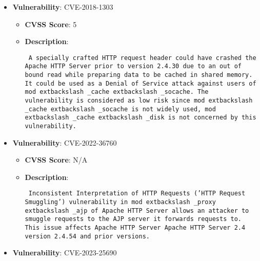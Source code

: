 \documentclass{article}
\begin{document}
\begin{itemize}
        \item \textbf{Vulnerability}: CVE-2018-1303
        \begin{itemize}
            \item \textbf{CVSS Score}:  5 
            \item \textbf{Description}: \parbox{\linewidth}{\texttt{ A specially crafted HTTP request header could have crashed the Apache HTTP Server prior to version 2.4.30 due to an out of bound read while preparing data to be cached in shared memory. It could be used as a Denial of Service attack against users of mod	extbackslash _cache	extbackslash _socache. The vulnerability is considered as low risk since mod	extbackslash _cache	extbackslash _socache is not widely used, mod	extbackslash _cache	extbackslash _disk is not concerned by this vulnerability. }}
        \end{itemize}
    
        \item \textbf{Vulnerability}: CVE-2022-36760
        \begin{itemize}
            \item \textbf{CVSS Score}:  N/A 
            \item \textbf{Description}: \parbox{\linewidth}{\texttt{ Inconsistent Interpretation of HTTP Requests ('HTTP Request Smuggling') vulnerability in mod	extbackslash _proxy	extbackslash _ajp of Apache HTTP Server allows an attacker to smuggle requests to the AJP server it forwards requests to.  This issue affects Apache HTTP Server Apache HTTP Server 2.4 version 2.4.54 and prior versions. }}
        \end{itemize}
    
        \item \textbf{Vulnerability}: CVE-2023-25690
\end{itemize}
\end{document}
